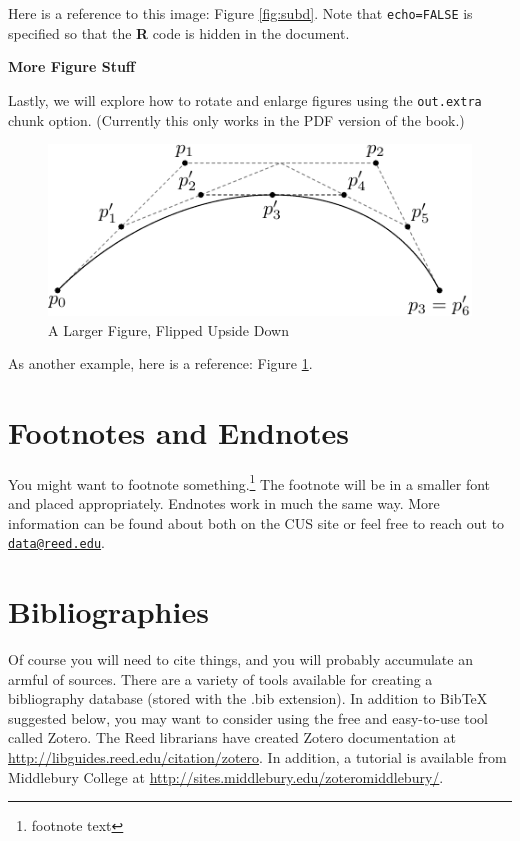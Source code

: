 \documentclass[12pt,twoside]{reedthesis}
\begin{document}
  Here is a reference to this image: Figure \ref{fig:subd}. Note that
  \texttt{echo=FALSE} is specified so that the \textbf{R} code is hidden
  in the document.
  
  \textbf{More Figure Stuff}
  
  Lastly, we will explore how to rotate and enlarge figures using the
  \texttt{out.extra} chunk option. (Currently this only works in the PDF
  version of the book.)
  
  \begin{figure}
  \includegraphics[angle=180, scale=1.1]{figure/subdivision} \caption{A Larger Figure, Flipped Upside Down}\label{fig:subd2}
  \end{figure}
  
  As another example, here is a reference: Figure \ref{fig:subd2}.
  
  \section{Footnotes and Endnotes}\label{footnotes-and-endnotes}
  
  You might want to footnote something.\footnote{footnote text} The
  footnote will be in a smaller font and placed appropriately. Endnotes
  work in much the same way. More information can be found about both on
  the CUS site or feel free to reach out to
  \href{mailto:data@reed.edu}{\nolinkurl{data@reed.edu}}.
  
  \section{Bibliographies}\label{bibliographies}
  
  Of course you will need to cite things, and you will probably accumulate
  an armful of sources. There are a variety of tools available for
  creating a bibliography database (stored with the .bib extension). In
  addition to BibTeX suggested below, you may want to consider using the
  free and easy-to-use tool called Zotero. The Reed librarians have
  created Zotero documentation at
  \url{http://libguides.reed.edu/citation/zotero}. In addition, a tutorial
  is available from Middlebury College at
  \url{http://sites.middlebury.edu/zoteromiddlebury/}.
  
\end{document}
